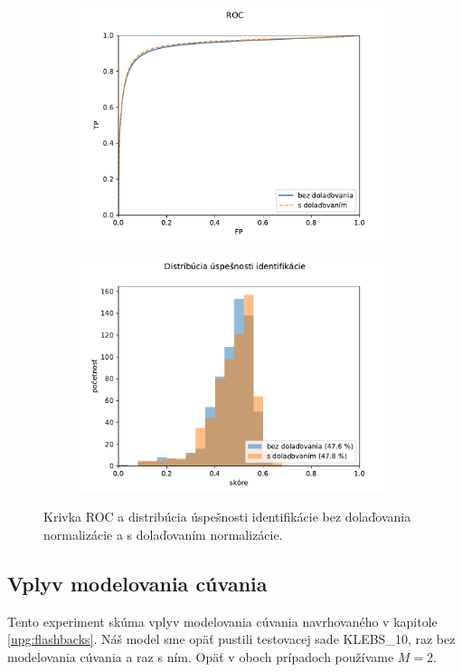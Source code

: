 \begin{figure}[t]
\begin{subfigure}{0.5\textwidth}
\centerline{\includegraphics[width=\linewidth]{plots/2_ROC}}
\end{subfigure}%
\begin{subfigure}{0.5\textwidth}
\centerline{\includegraphics[width=\linewidth]{plots/2_uspesnost_eqbins}}
\end{subfigure}
\caption{Krivka ROC a distribúcia úspešnosti identifikácie bez dolaďovania normalizácie a s dolaďovaním normalizácie.}
\label{fig:grafy_tweaking}
\end{figure}

\subsection{Vplyv modelovania cúvania}
\label{exp:flashbacks}
Tento experiment skúma vplyv modelovania cúvania navrhovaného v kapitole \ref{upg:flashbacks}. Náš model sme
opäť pustili testovacej sade KLEBS\_10, raz bez modelovania cúvania a raz s ním. Opäť v oboch prípadoch používame $M=2$.

